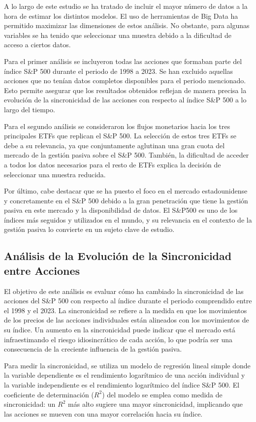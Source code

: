 \documentclass[12pt,a4paper]{article}
\begin{document}
A lo largo de este estudio se ha tratado de incluir el mayor número de datos a la hora de estimar los distintos modelos. El uso de herramientas de Big Data ha permitido maximizar las dimensiones de estos análisis. No obstante, para algunas variables se ha tenido que seleccionar una muestra debido a la dificultad de acceso a ciertos datos.

Para el primer análisis se incluyeron todas las acciones que formaban parte del índice S\&P 500 durante el periodo de 1998 a 2023. Se han excluido aquellas acciones que no tenían datos completos disponibles para el periodo mencionado. Esto permite asegurar que los resultados obtenidos reflejan de manera precisa la evolución de la sincronicidad de las acciones con respecto al índice S\&P 500 a lo largo del tiempo.

Para el segundo análisis se consideraron los flujos monetarios hacia los tres principales ETFs que replican el S\&P 500. La selección de estos tres ETFs se debe a su relevancia, ya que conjuntamente aglutinan una gran cuota del mercado de la gestión pasiva sobre el S\&P 500. También, la dificultad de acceder a todos los datos necesarios para el resto de ETFs explica la decisión de seleccionar una muestra reducida.

Por último, cabe destacar que se ha puesto el foco en el mercado estadounidense y concretamente en el S\&P 500 debido a la gran penetración que tiene la gestión pasiva en este mercado y la disponibilidad de datos. El S\&P500 es uno de los índices más seguidos y utilizados en el mundo, y su relevancia en el contexto de la gestión pasiva lo convierte en un sujeto clave de estudio.

\subsection{Análisis de la Evolución de la Sincronicidad entre Acciones}

El objetivo de este análisis es evaluar cómo ha cambiado la sincronicidad de las acciones del S\&P 500 con respecto al índice durante el periodo comprendido entre el 1998 y el 2023. La sincronicidad se refiere a la medida en que los movimientos de los precios de las acciones individuales están alineados con los movimientos de su índice. Un aumento en la sincronicidad puede indicar que el mercado está infraestimando el riesgo idiosincrático de cada acción, lo que podría ser una consecuencia de la creciente influencia de la gestión pasiva.

Para medir la sincronicidad, se utiliza un modelo de regresión lineal simple donde la variable dependiente es el rendimiento logarítmico de una acción individual y la variable independiente es el rendimiento logarítmico del índice S\&P 500. El coeficiente de determinación ($R^2$) del modelo se emplea como medida de sincronicidad: un $R^2$ más alto sugiere una mayor sincronicidad, implicando que las acciones se mueven con una mayor correlación hacia su índice.
\end{document}
